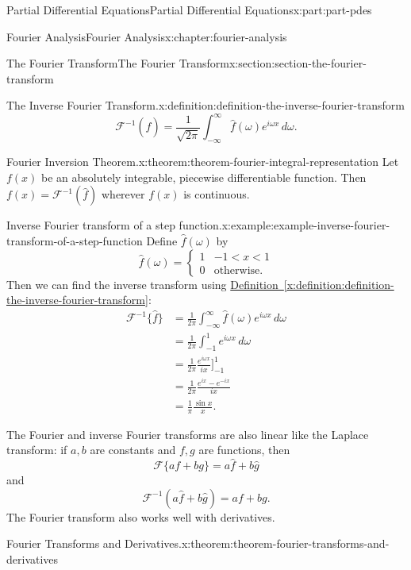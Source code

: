 \documentclass[oneside,10pt,]{book}
\newcommand{\xreffont}{\relax}
\numberwithin{equation}{part}
\newcommand{\amp}{&}
\begin{document}
\begin{partptx}{Partial Differential Equations}{}{Partial Differential Equations}{}{}{x:part:part-pdes}
\begin{chapterptx}{Fourier Analysis}{}{Fourier Analysis}{}{}{x:chapter:fourier-analysis}
\begin{sectionptx}{The Fourier Transform}{}{The Fourier Transform}{}{}{x:section:section-the-fourier-transform}
\begin{definition}{The Inverse Fourier Transform.}{x:definition:definition-the-inverse-fourier-transform}
\begin{equation*}
\mathcal{F}^{-1}(\hat{f}) = \frac{1}{\sqrt{2\pi}}\int_{-\infty}^{\infty}\hat{f}(\omega)e^{i\omega x}\,d\omega.
\end{equation*}
%
\end{definition}
\begin{theorem}{Fourier Inversion Theorem.}{}{x:theorem:theorem-fourier-integral-representation}%
%
Let \(f(x)\) be an absolutely integrable, piecewise differentiable function. Then \(f(x) = \mathcal{F}^{-1}(\hat{f})\) wherever \(f(x)\) is continuous.%
\end{theorem}
\begin{example}{Inverse Fourier transform of a step function.}{x:example:example-inverse-fourier-transform-of-a-step-function}%
Define \(\hat{f}(\omega)\) by%
\begin{equation*}
\hat{f}(\omega) = \begin{cases} 1 \amp -1 < x < 1 \\ 0 \amp \text{otherwise.}\end{cases}
\end{equation*}
Then we can find the inverse transform using \hyperref[x:definition:definition-the-inverse-fourier-transform]{Definition~{\xreffont\ref{x:definition:definition-the-inverse-fourier-transform}}}:%
\begin{align*}
\mathcal{F}^{-1}\{\hat{f}\} \amp = \frac{1}{2\pi}\int_{-\infty}^{\infty}\hat{f}(\omega)e^{i\omega x}\,d\omega \\
\amp = \frac{1}{2\pi}\int_{-1}^{1}e^{i\omega x}\,d\omega \\
\amp = \frac{1}{2\pi}\frac{e^{i\omega x}}{ix}\Big]_{-1}^{1} \\
\amp = \frac{1}{2\pi}\frac{e^{ix}-e^{-ix}}{ix} \\
\amp = \frac{1}{\pi}\frac{\sin x}{x}. 
\end{align*}
%
\end{example}
The Fourier and inverse Fourier transforms are also linear like the Laplace transform: if \(a,b\) are constants and \(f,g\) are functions, then%
\begin{equation*}
\mathcal{F}\{af+bg\} = a\hat{f}+b\hat{g}
\end{equation*}
and%
\begin{equation*}
\mathcal{F}^{-1}(a\hat{f}+b\hat{g}) = af + bg.
\end{equation*}
The Fourier transform also works well with derivatives.%
\begin{theorem}{Fourier Transforms and Derivatives.}{}{x:theorem:theorem-fourier-transforms-and-derivatives}%

\end{theorem}
\end{sectionptx}
\end{chapterptx}
\end{partptx}
\end{document}
